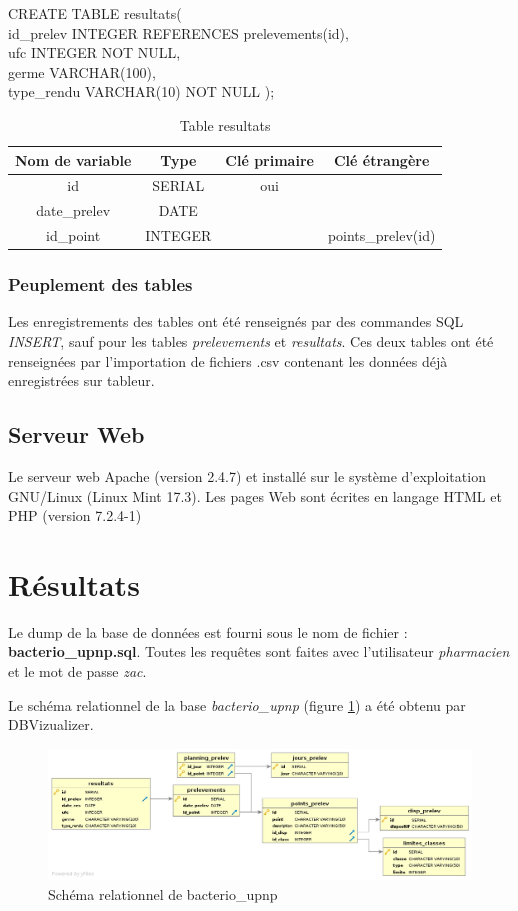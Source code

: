 \documentclass[12pt,a4paper,oneside]{article}
\begin{document}
\begin{description}
\begin{tabbing}
CREATE TABLE resultats(\\
id\_prelev INTEGER REFERENCES prelevements(id),\\
\nopagebreak
ufc INTEGER NOT NULL,\\
germe VARCHAR(100),\\
type\_rendu VARCHAR(10) NOT NULL
);
\end{tabbing}
\begin{table}
\caption{Table resultats \label{resultats}}
\begin{center}
\begin{tabular}{|c|c|c|c|}
	\hline
	\textbf{Nom de variable} & \textbf{Type} & \textbf{Clé primaire} & \textbf{Clé étrangère}\\
	\hline
	id & SERIAL & oui & \\
	date\_prelev & DATE & &\\
	id\_point & INTEGER & & points\_prelev(id)\\
	\hline
\end{tabular}
\end{center}
\end{table}

\end{description}

\subsubsection{Peuplement des tables}
Les enregistrements des tables ont été renseignés par des commandes SQL \emph{INSERT}, sauf pour les tables \emph{prelevements} et \emph{resultats}. Ces deux tables ont été renseignées par l'importation de fichiers .csv contenant les données déjà enregistrées sur tableur.
\subsection{Serveur Web}
Le serveur web Apache (version 2.4.7) et installé sur le système d'exploitation GNU/Linux (Linux Mint 17.3).
Les pages Web sont écrites en langage HTML et PHP (version 7.2.4-1)
\section{Résultats}
Le dump de la base de données est fourni sous le nom de fichier : \textbf{bacterio\_upnp.sql}. Toutes les requêtes sont faites avec l'utilisateur \emph{pharmacien} et le mot de passe \emph{zac}.

Le schéma relationnel de la base \emph{bacterio\_upnp} (figure \ref{erd}) a été obtenu par DBVizualizer.
\begin{figure}
\caption{\label{erd}Schéma relationnel de bacterio\_upnp}
\includegraphics[scale=0.4]{erd.png}
\end{figure}
\end{document}
